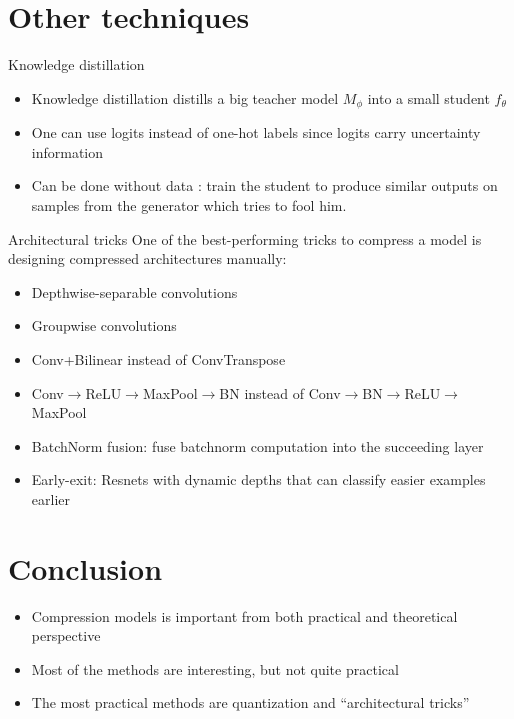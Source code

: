 \documentclass[10pt, handout]{beamer}
\begin{document}
\section{Other techniques}
\begin{frame}{Knowledge distillation}
    \begin{itemize}
        \item\pause Knowledge distillation distills a big teacher model $M_\phi$ into a small student $f_\theta$
        \item\pause One can use logits instead of one-hot labels since logits carry uncertainty information
        \item\pause Can be done without data \cite{Data_free_adv_knowledge_distillation}: train the student to produce similar outputs on samples from the generator which tries to fool him.
    \end{itemize}
\end{frame}

\begin{frame}{Architectural tricks}
    \pause
    One of the best-performing tricks to compress a model is designing compressed architectures manually:
    \begin{itemize}
        \item\pause Depthwise-separable convolutions
        \item\pause Groupwise convolutions
        \item\pause Conv+Bilinear instead of ConvTranspose
        \item\pause Conv$\to$ReLU$\to$MaxPool$\to$BN instead of Conv$\to$BN$\to$ReLU$\to$MaxPool
        \item\pause BatchNorm fusion: fuse batchnorm computation into the succeeding layer
        \item\pause Early-exit: Resnets with dynamic depths that can classify easier examples earlier \cite{Dynamic_depth}
    \end{itemize}
\end{frame}

\section{Conclusion}
\begin{frame}
    \begin{itemize}
        \item\pause Compression models is important from both practical and theoretical perspective
        \item\pause Most of the methods are interesting, but not quite practical
        \item\pause The most practical methods are quantization and ``architectural tricks''
    \end{itemize}
\end{frame}
\end{document}
